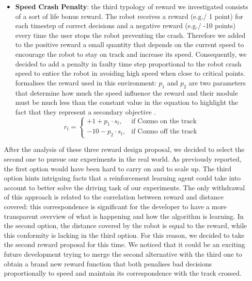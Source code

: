 \begin{itemize}
    \item \textbf{Speed Crash Penalty}: the third typology of reward we investigated consists of a sort of life bonus reward.
          The robot receives a reward (e.g./ 1 point) for each timestep of correct decisions and a negative reward (e.g./ -10 points) every time the user stops the robot preventing the crash.
          Therefore we added to the positive reward a small quantity that depends on the current speed to encourage the robot to stay on track and increase its speed.
          Consequently, we decided to add a penalty in faulty time step proportional to the robot crash speed to entice the robot in avoiding high speed when close to critical points.
           formalises the reward used in this environment: $p_1$ and $p_2$ are two parameters that determine how much the speed influence the reward and their module must be much less than the constant value in the equation to highlight the fact that they represent a secondary objective \cite{raffin2019learning}.
          \begin{equation}
              r_t = \begin{cases}
                  +1 + p_1 \cdot s_t, & \mbox{if } \mbox{Cozmo on the track} \\ -10 - p_2 \cdot s_t, & \mbox{if } \mbox{Cozmo off the track}
              \end{cases}
              \label{eq:speedCrashPenalty}
          \end{equation}

\end{itemize}

After the analysis of these three reward design proposal, we decided to select the second one to pursue our experiments in the real world.
As previously reported, the first option would have been hard to carry on and to scale up.
The third option hints intriguing facts that a reinforcement learning agent could take into account to better solve the driving task of our experiments.
The only withdrawal of this approach is related to the correlation between reward and distance covered: this correspondence is significant for the developer to have a more transparent overview of what is happening and how the algorithm is learning.
In the second option, the distance covered by the robot is equal to the reward, while this conformity is lacking in the third option.
For this reason, we decided to take the second reward proposal for this time.
We noticed that it could be an exciting future development trying to merge the second alternative with the third one to obtain a brand new reward function that both penalises bad decisions proportionally to speed and maintain its correspondence with the track crossed.

